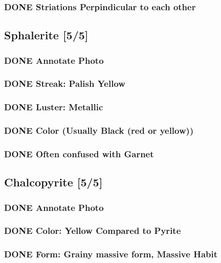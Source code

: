 \documentclass[11pt]{article}
\begin{document}
\subsubsection{{\bfseries\sffamily DONE} Striations Perpindicular to each other}
\label{sec-2-3-5}
\subsection{Sphalerite [5/5]}
\label{sec-2-4}
\subsubsection{{\bfseries\sffamily DONE} Annotate Photo}
\label{sec-2-4-1}
\subsubsection{{\bfseries\sffamily DONE} Streak: Palish Yellow}
\label{sec-2-4-2}
\subsubsection{{\bfseries\sffamily DONE} Luster: Metallic}
\label{sec-2-4-3}
\subsubsection{{\bfseries\sffamily DONE} Color (Usually Black (red or yellow))}
\label{sec-2-4-4}
\subsubsection{{\bfseries\sffamily DONE} Often confused with Garnet}
\label{sec-2-4-5}
\subsection{Chalcopyrite [5/5]}
\label{sec-2-5}
\subsubsection{{\bfseries\sffamily DONE} Annotate Photo}
\label{sec-2-5-1}
\subsubsection{{\bfseries\sffamily DONE} Color: Yellow Compared to Pyrite}
\label{sec-2-5-2}
\subsubsection{{\bfseries\sffamily DONE} Form: Grainy massive form, Massive Habit}
\label{sec-2-5-3}
\end{document}
